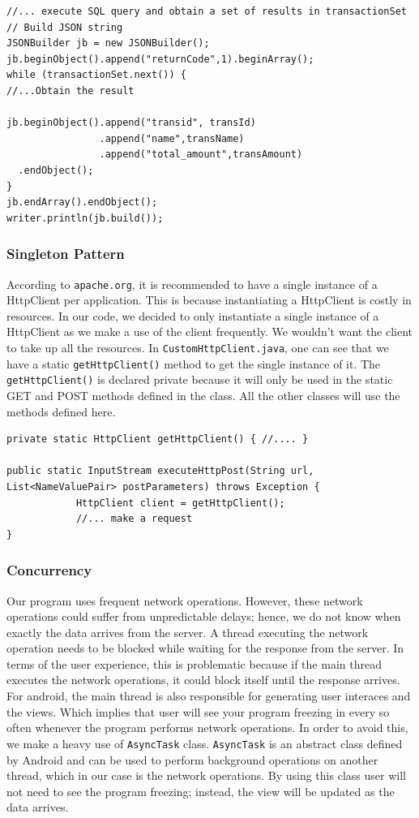 \documentclass[a4paper,11pt]{article}
\begin{document}
\begin{verbatim}
//... execute SQL query and obtain a set of results in transactionSet
// Build JSON string
JSONBuilder jb = new JSONBuilder();
jb.beginObject().append("returnCode",1).beginArray();
while (transactionSet.next()) {
//...Obtain the result
						
jb.beginObject().append("transid", transId)
                .append("name",transName)
                .append("total_amount",transAmount)
  .endObject();
}
jb.endArray().endObject();			
writer.println(jb.build());
\end{verbatim}

\subsubsection*{Singleton Pattern}

According to \texttt{apache.org}, it is recommended to have a single instance of a HttpClient per application. This is because instantiating a HttpClient is costly in resources. In our code, we decided to only instantiate a single instance of a HttpClient as we make a use of the client frequently. We wouldn't want the client to take up all the resources. In \texttt{CustomHttpClient.java}, one can see that we have a static \texttt{getHttpClient()} method to get the single instance of it. The \texttt{getHttpClient()} is declared private because it will only be used in the static GET and POST methods defined in the class. All the other classes will use the methods defined here. 

\begin{verbatim}
private static HttpClient getHttpClient() { //.... }

public static InputStream executeHttpPost(String url, List<NameValuePair> postParameters) throws Exception {
            HttpClient client = getHttpClient();
            //... make a request
}  
\end{verbatim} 

\subsubsection*{Concurrency}

Our program uses frequent network operations. However, these network operations could suffer from unpredictable delays; hence, we do not know when exactly the data arrives from the server. A thread executing the network operation needs to be blocked while waiting for the response from the server. In terms of the user experience, this is problematic because if the main thread executes the network operations, it could block itself until the response arrives. For android, the main thread is also responsible for generating user interaces and the views. Which implies that user will see your program freezing in every so often whenever the program performs network operations. In order to avoid this, we make a heavy use of \texttt{AsyncTask} class. \texttt{AsyncTask} is an abstract class defined by Android and can be used to perform background operations on another thread, which in our case is the network operations. By using this class user will not need to see the program freezing; instead, the view will be updated as the data arrives.     
 
\end{document}
